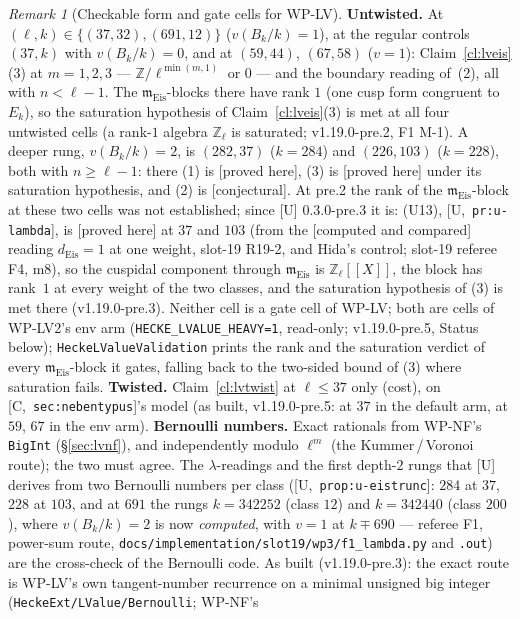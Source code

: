 \documentclass[11pt]{article}
\theoremstyle{remark}
\newtheorem{remark}[theorem]{Remark}
\newcommand{\Z}{\mathbb{Z}}
\newcommand{\m}{\mathfrak{m}}
\newcommand{\HA}[1]{[C,~\texttt{#1}]}      %
\newcommand{\PROVED}{\textsf{[proved here]}}
\newcommand{\CONJ}{\textsf{[conjectural]}}
\newcommand{\CMPD}{\textsf{[computed and compared]}}   %
\newcommand{\Ucite}[1]{[U,~\texttt{#1}]}               %
\begin{document}
\begin{remark}[Checkable form and gate cells for WP-LV]\label{rmk:lvgates}
\textbf{Untwisted.} At $(\ell,k)\in\{(37,32),(691,12)\}$ ($v(B_k/k)=1$), at the regular controls $(37,k)$ with $v(B_k/k)=0$, and at $(59,44)$, $(67,58)$
($v=1$): Claim~\ref{cl:lveis}(3) at $m=1,2,3$ --- $\Z/\ell^{\min(m,1)}$ or $0$ --- and the boundary reading of~(2), all with $n<\ell-1$. The $\m_{\mathrm{Eis}}$-blocks
there have rank $1$ (one cusp form congruent to $E_k$), so the saturation hypothesis of Claim~\ref{cl:lveis}(3) is met at all four untwisted cells (a rank-$1$
algebra $\Z_\ell$ is saturated; v1.19.0-pre.2, F1 M-1). A deeper rung, $v(B_k/k)=2$, is $(282,37)$ ($k=284$) and $(226,103)$ ($k=228$),
both with $n\ge\ell-1$: there (1) is \PROVED, (3) is \PROVED{} under its saturation hypothesis, and (2) is \CONJ. At pre.2 the rank of the $\m_{\mathrm{Eis}}$-block at these two
cells was not established; since [U] 0.3.0-pre.3 it is: (U13), \Ucite{pr:u-lambda}, is \PROVED{} at $37$ and $103$ (from the \CMPD{} reading $d_{\mathrm{Eis}}=1$ at
one weight, slot-19 R19-2, and Hida's control; slot-19 referee F4, m8), so the cuspidal component through $\m_{\mathrm{Eis}}$ is $\Z_\ell[[X]]$, the block has rank~$1$ at every
weight of the two classes, and the saturation hypothesis of (3) is met there (v1.19.0-pre.3). Neither cell is a gate cell of WP-LV; both are cells of WP-LV2's env arm
(\texttt{HECKE\_LVALUE\_HEAVY=1}, read-only; v1.19.0-pre.5, Status below);
\texttt{HeckeLValueValidation} prints the rank and the saturation verdict of every $\m_{\mathrm{Eis}}$-block it gates, falling back to the two-sided bound of (3) where
saturation fails. \textbf{Twisted.} Claim~\ref{cl:lvtwist} at $\ell\le37$ only (cost), on \HA{sec:nebentypus}'s
model (as built, v1.19.0-pre.5: at $37$ in the default arm, at $59$, $67$ in the env arm). \textbf{Bernoulli numbers.} Exact rationals from WP-NF's \texttt{BigInt} (\S\ref{sec:lvnf}), and independently modulo $\ell^{m}$ (the Kummer\,/\,Voronoi route);
the two must agree. The $\lambda$-readings and the first depth-$2$ rungs that [U] derives from two Bernoulli numbers per class (\Ucite{prop:u-eistrunc}: $284$ at $37$,
$228$ at $103$, and at $691$ the rungs $k=342252$ (class $12$) and $k=342440$ (class $200$), where $v(B_k/k)=2$ is now \emph{computed}, with $v=1$ at $k\mp690$ ---
referee F1, power-sum route, \texttt{docs/implementation/slot19/wp3/f1\_lambda.py} and \texttt{.out}) are the cross-check of the Bernoulli code. As built
(v1.19.0-pre.3): the exact route is WP-LV's own tangent-number recurrence on a minimal unsigned big integer (\texttt{HeckeExt/LValue/Bernoulli}; WP-NF's

\end{remark}
\end{document}
